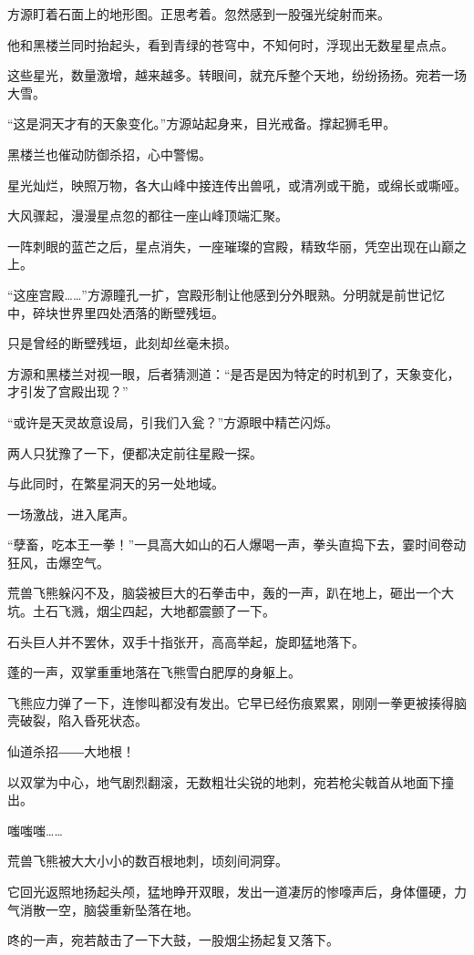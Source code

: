 \begin{this_body}
方源盯着石面上的地形图。正思考着。忽然感到一股强光绽射而来。

他和黑楼兰同时抬起头，看到青绿的苍穹中，不知何时，浮现出无数星星点点。

这些星光，数量激增，越来越多。转眼间，就充斥整个天地，纷纷扬扬。宛若一场大雪。

“这是洞天才有的天象变化。”方源站起身来，目光戒备。撑起狮毛甲。

黑楼兰也催动防御杀招，心中警惕。

星光灿烂，映照万物，各大山峰中接连传出兽吼，或清冽或干脆，或绵长或嘶哑。

大风骤起，漫漫星点忽的都往一座山峰顶端汇聚。

一阵刺眼的蓝芒之后，星点消失，一座璀璨的宫殿，精致华丽，凭空出现在山巅之上。

“这座宫殿……”方源瞳孔一扩，宫殿形制让他感到分外眼熟。分明就是前世记忆中，碎块世界里四处洒落的断壁残垣。

只是曾经的断壁残垣，此刻却丝毫未损。

方源和黑楼兰对视一眼，后者猜测道：“是否是因为特定的时机到了，天象变化，才引发了宫殿出现？”

“或许是天灵故意设局，引我们入瓮？”方源眼中精芒闪烁。

两人只犹豫了一下，便都决定前往星殿一探。

与此同时，在繁星洞天的另一处地域。

一场激战，进入尾声。

“孽畜，吃本王一拳！”一具高大如山的石人爆喝一声，拳头直捣下去，霎时间卷动狂风，击爆空气。

荒兽飞熊躲闪不及，脑袋被巨大的石拳击中，轰的一声，趴在地上，砸出一个大坑。土石飞溅，烟尘四起，大地都震颤了一下。

石头巨人并不罢休，双手十指张开，高高举起，旋即猛地落下。

蓬的一声，双掌重重地落在飞熊雪白肥厚的身躯上。

飞熊应力弹了一下，连惨叫都没有发出。它早已经伤痕累累，刚刚一拳更被揍得脑壳破裂，陷入昏死状态。

仙道杀招――大地根！

以双掌为中心，地气剧烈翻滚，无数粗壮尖锐的地刺，宛若枪尖戟首从地面下撞出。

嗤嗤嗤……

荒兽飞熊被大大小小的数百根地刺，顷刻间洞穿。

它回光返照地扬起头颅，猛地睁开双眼，发出一道凄厉的惨嚎声后，身体僵硬，力气消散一空，脑袋重新坠落在地。

咚的一声，宛若敲击了一下大鼓，一股烟尘扬起复又落下。


\end{this_body}
